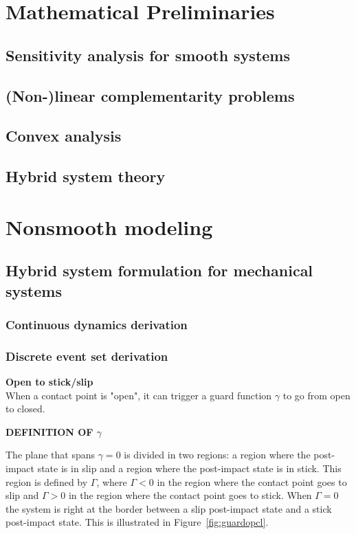 \documentclass[../DC2017114Bouma.tex]{subfiles}
\begin{document}
\pagestyle{fancyreport}
\cleartooddpage
\pagestyle{fancyreport}
\chapter{Mathematical Preliminaries}
\section{Sensitivity analysis for smooth systems}
\section{(Non-)linear complementarity problems}
\section{Convex analysis}
\section{Hybrid system theory}

\cleartooddpage
\chapter{Nonsmooth modeling}
\section{Hybrid system formulation for mechanical systems}\label{app:hybrid}
\subsection{Continuous dynamics derivation}
\subsection{Discrete event set derivation}\label{app:hybriddisc}
\textbf{Open to stick/slip}\\
When a contact point is "open", it can trigger a guard function $\gamma$ to go from open to closed.

\textbf{DEFINITION OF $\gamma$}

The plane that spans $\gamma = 0$ is divided in two regions: a region where the post-impact state is in slip and a region where the post-impact state is in stick. This region is defined by $\Gamma$, where $\Gamma<0$ in the region where the contact point goes to slip and $\Gamma > 0$ in the region where the contact point goes to stick. When $\Gamma = 0$ the system is right at the border between a slip post-impact state and a stick post-impact state. This is illustrated in Figure~\ref{fig:guardopcl}. 
\end{document}
